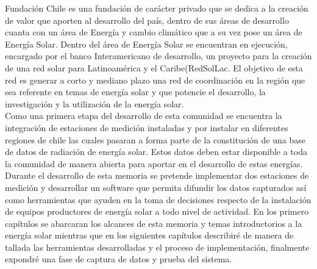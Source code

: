 Fundación Chile es una fundación de carácter privado que se dedica a la creación de valor que aporten al desarrollo del país, dentro de sus áreas de desarrollo cuanta con un área de Energía y cambio climático que a su vez pose un área de Energía Solar. Dentro del área de Energía Solar se encuentran en ejecución, encargado por el banco Interamericano de desarrollo, un proyecto para la creación de una red solar para Latinoamérica y el Caribe(RedSolLac\cite{redSolLac:1}. El objetivo de esta red es generar a corto y mediano plazo una red de coordinación en la región que sea referente en temas de energía solar y que potencie el desarrollo, la investigación y la utilización de la energía solar.\\
 
Como una primera etapa del desarrollo de esta comunidad se encuentra la integración de estaciones de medición instaladas y por instalar en diferentes regiones de chile las cuales pasaran a forma parte de la constitución de una base de datos de radiación de energía solar. Estos datos deben estar disponible a toda la comunidad de manera abierta para aportar en el desarrollo de estas energías.\\

Durante el desarrollo de esta memoria se pretende implementar dos estaciones de medición y desarrollar un software que permita difundir los datos capturados así como herramientas que ayuden en la toma de decisiones respecto de la instalación de equipos productores de energía solar a todo nivel de actividad. En los primero capítulos se abarcaran los alcances de esta memoria y temas introductorios a la energía solar mientras que en los siguientes capítulos describiré de manera de tallada las herramientas desarrolladas y el proceso de implementación, finalmente expondré una fase de captura de datos y prueba del sistema.
